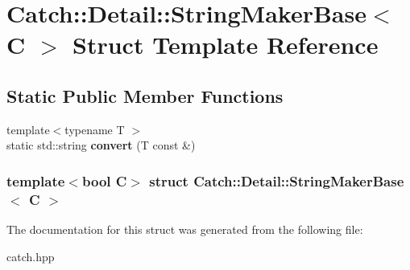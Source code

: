 \hypertarget{structCatch_1_1Detail_1_1StringMakerBase}{
\section{Catch::Detail::StringMakerBase$<$ C $>$ Struct Template Reference}
\label{structCatch_1_1Detail_1_1StringMakerBase}
}
\subsection*{Static Public Member Functions}
\begin{DoxyCompactItemize}
\item 
\hypertarget{structCatch_1_1Detail_1_1StringMakerBase_a8fc6ea5eea806fa6de46251360d38a62}{
{\footnotesize template$<$typename T $>$ }\\static std::string {\bfseries convert} (T const \&)}
\label{structCatch_1_1Detail_1_1StringMakerBase_a8fc6ea5eea806fa6de46251360d38a62}

\end{DoxyCompactItemize}
\subsubsection*{template$<$bool C$>$ struct Catch::Detail::StringMakerBase$<$ C $>$}



The documentation for this struct was generated from the following file:\begin{DoxyCompactItemize}
\item 
catch.hpp\end{DoxyCompactItemize}
